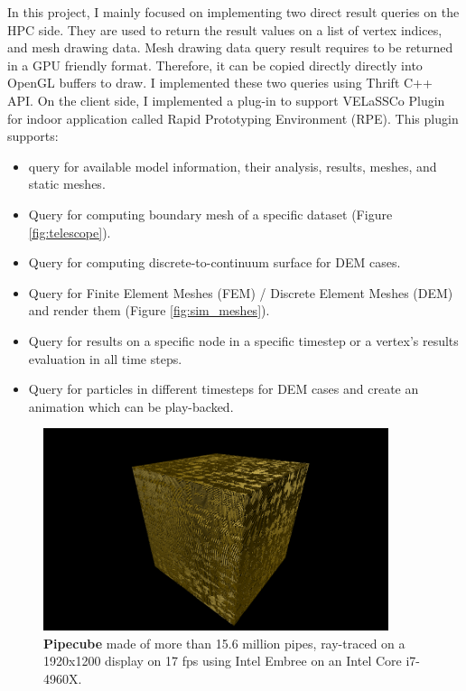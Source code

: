 \documentclass[]{report}
\begin{document}
In this project, I mainly focused on implementing two direct result queries on the HPC side. They are used to return the result values on a list of vertex indices, and mesh drawing data. Mesh drawing data query result requires to be returned in a GPU friendly format. Therefore, it can be copied directly directly into OpenGL buffers to draw. I implemented these two queries using Thrift C++ API. On the client side, I implemented a plug-in to support VELaSSCo Plugin for indoor application called Rapid Prototyping Environment (RPE). This plugin supports:
  
\begin{itemize}
	\item query for available model information, their analysis, results, meshes, and static meshes.
	\item Query for computing boundary mesh of a specific dataset (Figure \ref{fig:telescope}).
	\item Query for computing discrete-to-continuum surface for DEM cases.
	\item Query for Finite Element Meshes (FEM) / Discrete Element Meshes (DEM) and render them (Figure \ref{fig:sim_meshes}).
	\item Query for results on a specific node in a specific timestep or a vertex's results evaluation in all time steps.
	\item Query for particles in different timesteps for DEM cases and create an animation which can be play-backed.
\end{itemize}

\begin{figure}[!ht]
	\centering
	\includegraphics[width=0.90\textwidth]{./figs/pipecube.png}
	\caption[Pipecube]{\textbf{Pipecube} made of more than 15.6 million pipes, ray-traced on a 1920x1200 display on 17 fps using Intel Embree on an Intel Core i7-4960X.}
	\label{fig:pipecube}
\end{figure}
\end{document}
